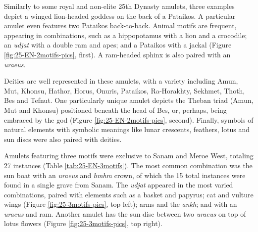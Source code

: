 Similarly to some royal and non-elite 25th Dynasty amulets, three examples depict a winged lion-headed goddess on the back of a Pataikos. A particular amulet even features two Pataikos back-to-back. Animal motifs are frequent, appearing in combinations, such as a hippopotamus with a lion and a crocodile; an \textit{udjat} with a double ram and apes; and a Pataikos with a jackal (Figure \ref{fig:25-EN-2motifs-pics}, first). A ram-headed sphinx is also paired with an \textit{uraeus}.


Deities are well represented in these amulets, with a variety including Amun, Mut, Khonsu, Hathor, Horus, Onuris, Pataikos, Ra-Horakhty, Sekhmet, Thoth, Bes and Tefnut. One particularly unique amulet depicts the Theban triad (Amun, Mut and Khonsu) positioned beneath the head of Bes, or, perhaps, being embraced by the god (Figure \ref{fig:25-EN-2motifs-pics}, second). Finally, symbols of natural elements with symbolic meanings like lunar crescents, feathers, lotus and sun discs were also paired with deities.


Amulets featuring three motifs were exclusive to Sanam and Meroe West, totaling 27 instances (Table \ref{tab:25-EN-3motifs}). The most common combination was the sun boat with an \textit{uraeus} and \textit{hmhm} crown, of which the 15 total instances were found in a single grave from Sanam. The \textit{udjat} appeared in the most varied combinations, paired with elements such as a basket and papyrus; cat and vulture wings (Figure \ref{fig:25-3motifs-pics}, top left); arms and the \textit{ankh}; and with an \textit{uraeus} and ram. Another amulet has the sun disc between two \textit{uraeus} on top of lotus flowers (Figure \ref{fig:25-3motifs-pics}, top right).


